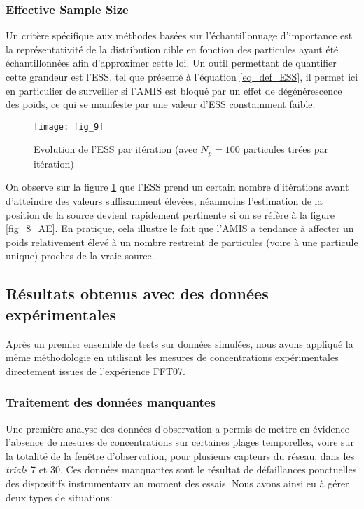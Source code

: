 { \subsubsection{Effective Sample Size}
 
 Un critère spécifique aux méthodes basées sur l'échantillonnage d'importance est la représentativité de la distribution cible en fonction des particules ayant été échantillonnées afin d'approximer cette loi. Un outil permettant de quantifier cette grandeur est l'ESS, tel que présenté à l'équation \eqref{eq_def_ESS}, il permet ici en particulier de surveiller si l'AMIS est bloqué par un effet de dégénérescence des poids, ce qui se manifeste par une valeur d'ESS constamment faible. \\
 
 \begin{figure}[h!]
 	\centering
 	\texttt{[image: fig\_9]}
 	\caption{Evolution de l'ESS par itération (avec $N_p=100$ particules tirées par itération)}
 	\label{fig_9_AE}
 \end{figure}
 
 On observe sur la figure \ref{fig_9_AE} que l'ESS prend un certain {nombre d'itérations} avant d'atteindre des valeurs suffisamment élevées, néanmoins l'estimation de la position de la source devient rapidement pertinente si on se réfère à la figure \ref{fig_8_AE}. En pratique, cela illustre le fait que l'AMIS a tendance à affecter un poids relativement élevé à un nombre restreint de particules (voire à une particule unique) proches de la vraie source. 
 
 
 \subsection{Résultats obtenus avec des données expérimentales}
 
 Après un premier ensemble de tests sur données simulées, nous avons appliqué la même méthodologie en utilisant les mesures de concentrations expérimentales directement issues de l'expérience FFT07. \\
 
 \subsubsection{Traitement des données manquantes}
 
 Une première analyse des données d'observation a permis de mettre en évidence l'absence de mesures de concentrations sur certaines plages temporelles, voire sur la totalité de la fenêtre d'observation, pour plusieurs capteurs du réseau, dans les \textit{trials} 7 et 30. Ces données manquantes sont le résultat de défaillances ponctuelles des dispositifs instrumentaux au moment des essais. Nous avons ainsi eu à gérer deux types de situations:
 
}
